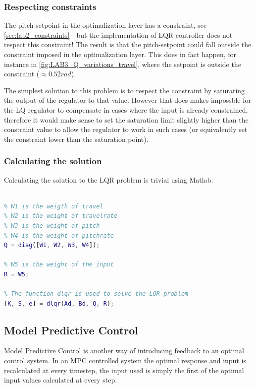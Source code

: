 \documentclass[../main.tex]{subfiles}
\begin{document}
\subsubsection{Respecting constraints}
The pitch-setpoint in the optimalization layer has a constraint, see \cref{sec:lab2_constraints} - but the implementation of LQR controller does not respect this constraint! The result is that the pitch-setpoint could fall outside the constraint imposed in the optimalization layer. This does in fact happen, for instance in \cref{fig:LAB3_Q_variations_travel}, where the setpoint is outside the constraint ($\approx 0.52 rad $).

The simplest solution to this problem is to respect the constraint by saturating the output of the regulator to that value. However that does makes impossble for the LQ regulator to compensate in cases where the input is already constrained, therefore it would make sense to set the saturation limit slightly higher than the constraint value to allow the regulator to work in such cases (or equivalently set the constraint lower than the saturation point).

\subsubsection{Calculating the solution}
Calculating the solution to the LQR problem is trivial using Matlab:
\begin{lstlisting}[language=Matlab]
% The discrete system described as a state space system, Ad and Bd must be defined

% W1 is the weigth of travel
% W2 is the weight of travelrate
% W3 is the weight of pitch
% W4 is the weight of pitchrate
Q = diag([W1, W2, W3, W4]);

% W5 is the weight of the input
R = W5;

% The function dlqr is used to solve the LQR problem
[K, S, e] = dlqr(Ad, Bd, Q, R);
\end{lstlisting}

\subsection{Model Predictive Control}\label{kap:10_3_mpc}
Model Predictive Control is another way of introducing feedback to an optimal control system. In an MPC controlled system the optimal response and input is recalculated at every timestep, the input used is simply the first of the optimal input values calculated at every step.
\end{document}
